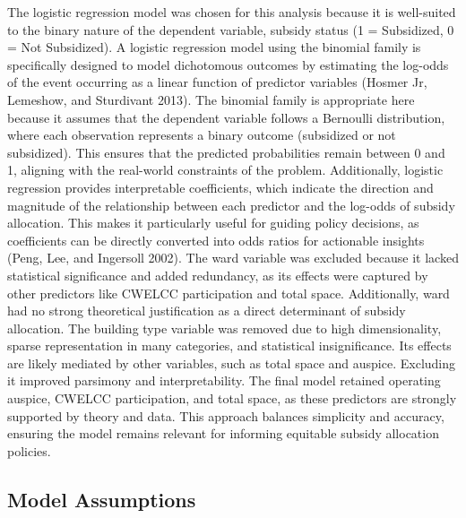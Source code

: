 \documentclass[
  letterpaper,
  DIV=11,
  numbers=noendperiod]{scrartcl}
\begin{document}
The logistic regression model was chosen for this analysis because it is
well-suited to the binary nature of the dependent variable, subsidy
status (1 = Subsidized, 0 = Not Subsidized). A logistic regression model
using the binomial family is specifically designed to model dichotomous
outcomes by estimating the log-odds of the event occurring as a linear
function of predictor variables (Hosmer Jr, Lemeshow, and Sturdivant
2013). The binomial family is appropriate here because it assumes that
the dependent variable follows a Bernoulli distribution, where each
observation represents a binary outcome (subsidized or not subsidized).
This ensures that the predicted probabilities remain between 0 and 1,
aligning with the real-world constraints of the problem. Additionally,
logistic regression provides interpretable coefficients, which indicate
the direction and magnitude of the relationship between each predictor
and the log-odds of subsidy allocation. This makes it particularly
useful for guiding policy decisions, as coefficients can be directly
converted into odds ratios for actionable insights (Peng, Lee, and
Ingersoll 2002). The ward variable was excluded because it lacked
statistical significance and added redundancy, as its effects were
captured by other predictors like CWELCC participation and total space.
Additionally, ward had no strong theoretical justification as a direct
determinant of subsidy allocation. The building type variable was
removed due to high dimensionality, sparse representation in many
categories, and statistical insignificance. Its effects are likely
mediated by other variables, such as total space and auspice. Excluding
it improved parsimony and interpretability. The final model retained
operating auspice, CWELCC participation, and total space, as these
predictors are strongly supported by theory and data. This approach
balances simplicity and accuracy, ensuring the model remains relevant
for informing equitable subsidy allocation policies.

\subsection{Model Assumptions}\label{model-assumptions}
\end{document}
